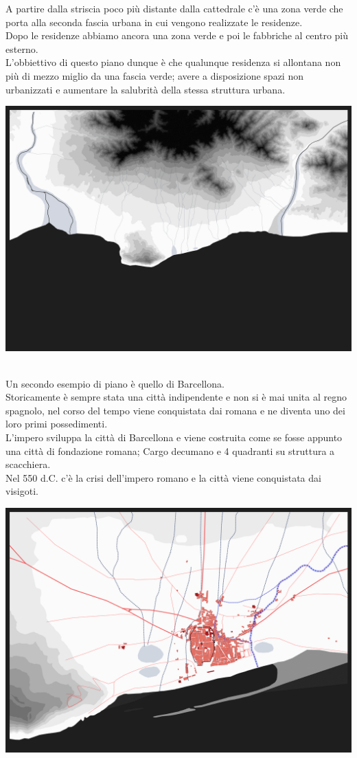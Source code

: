 \documentclass[a4paper,12pt, oneside]{book}
\begin{document}
    A partire dalla striscia poco più distante dalla cattedrale c'è una zona verde che porta alla seconda fascia urbana in cui vengono realizzate le residenze.\\
    Dopo le residenze abbiamo ancora una zona verde e poi le fabbriche al centro più esterno.\\
    L'obbiettivo di questo piano dunque è che qualunque residenza si allontana non più di mezzo miglio da una fascia verde; avere a disposizione spazi non urbanizzati e aumentare la salubrità della stessa struttura urbana.\\
    \begin{center}
    	\includegraphics[width=0.6\linewidth]{"immagini/carta historica barcelona 1"}
    	\label{fig:barcelona1}
    \end{center}
    \leavevmode\\
    Un secondo esempio di piano è quello di Barcellona.\\
    Storicamente è sempre stata una città indipendente e non si è mai unita al regno spagnolo, nel corso del tempo viene conquistata dai romana e ne diventa uno dei loro primi possedimenti.\\
    L'impero sviluppa la città di Barcellona e viene costruita come se fosse appunto una città di fondazione romana; Cargo decumano e 4 quadranti su struttura a scacchiera.\\
    Nel 550 d.C. c'è la crisi dell'impero romano e la città viene conquistata dai visigoti.\\
    \begin{center}
    	\includegraphics[width=0.6\linewidth]{"immagini/carta historica barcelona 2"}
    	\label{fig:barcelona2}
    \end{center}
\end{document}
